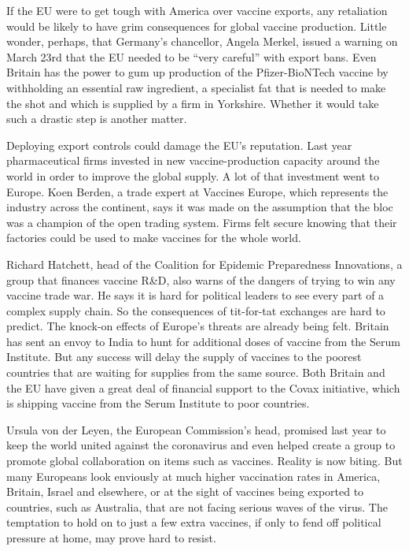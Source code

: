 \documentclass{article}
\begin{document}
If the EU were to get tough with America over vaccine exports, any retaliation would be likely to have grim consequences for global vaccine production. Little wonder, perhaps, that Germany's chancellor, Angela Merkel, issued a warning on March 23rd that the EU needed to be ``very careful'' with export bans. Even Britain has the power to gum up production of the Pfizer-BioNTech vaccine by withholding an essential raw ingredient, a specialist fat that is needed to make the shot and which is supplied by a firm in Yorkshire. Whether it would take such a drastic step is another matter. 

 

Deploying export controls could damage the EU's reputation. Last year pharmaceutical firms invested in new vaccine-production capacity around the world in order to improve the global supply. A lot of that investment went to Europe. Koen Berden, a trade expert at Vaccines Europe, which represents the industry across the continent, says it was made on the assumption that the bloc was a champion of the open trading system. Firms felt secure knowing that their factories could be used to make vaccines for the whole world. 

Richard Hatchett, head of the Coalition for Epidemic Preparedness Innovations, a group that finances vaccine R\&D, also warns of the dangers of trying to win any vaccine trade war. He says it is hard for political leaders to see every part of a complex supply chain. So the consequences of tit-for-tat exchanges are hard to predict. The knock-on effects of Europe's threats are already being felt. Britain has sent an envoy to India to hunt for additional doses of vaccine from the Serum Institute. But any success will delay the supply of vaccines to the poorest countries that are waiting for supplies from the same source. Both Britain and the EU have given a great deal of financial support to the Covax initiative, which is shipping vaccine from the Serum Institute to poor countries. 

Ursula von der Leyen, the European Commission's head, promised last year to keep the world united against the coronavirus and even helped create a group to promote global collaboration on items such as vaccines. Reality is now biting. But many Europeans look enviously at much higher vaccination rates in America, Britain, Israel and elsewhere, or at the sight of vaccines being exported to countries, such as Australia, that are not facing serious waves of the virus. The temptation to hold on to just a few extra vaccines, if only to fend off political pressure at home, may prove hard to resist. {} 
\end{document}
